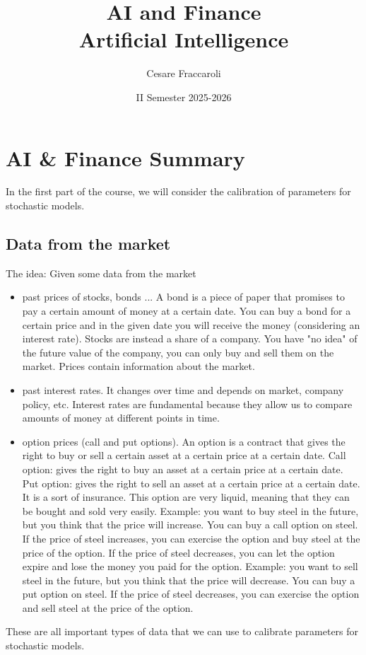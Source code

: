 \documentclass[11pt,a4paper]{article}
\title{\textbf{AI and Finance}\\
\large Artificial Intelligence}
\author{Cesare Fraccaroli}
\date{II Semester 2025-2026}
\theoremstyle{definition}
\theoremstyle{plain}
\theoremstyle{remark}
\begin{document}
\maketitle
\tableofcontents
\newpage

\section{AI \& Finance Summary}

In the first part of the course, we will consider the calibration of parameters for 
stochastic models.

\subsection{Data from the market}
The idea: Given some data from the market
\begin{itemize}
    \item past prices of stocks, bonds ...
    A bond is a piece of paper that promises to pay a certain amount of money at a certain date.
    You can buy a bond for a certain price and in the given date you will receive the money
    (considering an interest rate).
    Stocks are instead a share of a company. You have "no idea" of the future value of the company,
    you can only buy and sell them on the market.
    Prices contain information about the market.
    \item past interest rates. It changes over time and depends on market, company policy, etc.
    Interest rates are fundamental because they allow us to compare amounts of money at different points in time.
    \item option prices (call and put options). 
    An option is a contract that gives the right to buy or sell a certain asset at a
    certain price at a certain date.
    Call option: gives the right to buy an asset at a certain price at a certain date.
    Put option: gives the right to sell an asset at a certain price at a certain date.
    It is a sort of insurance.
    This option are very liquid, meaning that they can be bought and sold very easily.
    Example: you want to buy steel in the future, but you think that the price will increase.
    You can buy a call option on steel. If the price of steel increases, 
    you can exercise the option and buy steel at the price of the option.
    If the price of steel decreases, you can let the option expire and lose the money you paid for the option.
    Example: you want to sell steel in the future, but you think that the price will decrease.
    You can buy a put option on steel. If the price of steel decreases, 
    you can exercise the option and sell steel at the price of the option.
    

\end{itemize}
These are all important types of data that we can use to calibrate parameters for stochastic models.
\end{document}
